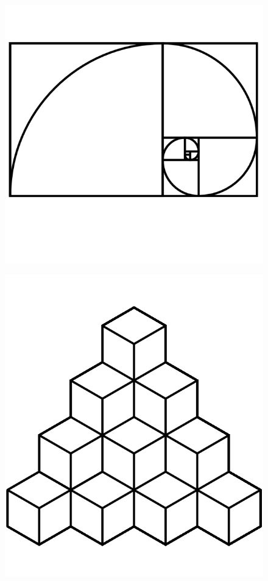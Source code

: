 \documentclass[17pt]{extreport}
\begin{document}
	\begin{figure}
		\centering
		\includegraphics[width=7.25in]{imageserver/uploadimages/image18.png}		
	\end{figure}
	\begin{figure}
		\centering
		\includegraphics[width=7.25in]{imageserver/uploadimages/qubert.png}
	\end{figure}
\end{document}
